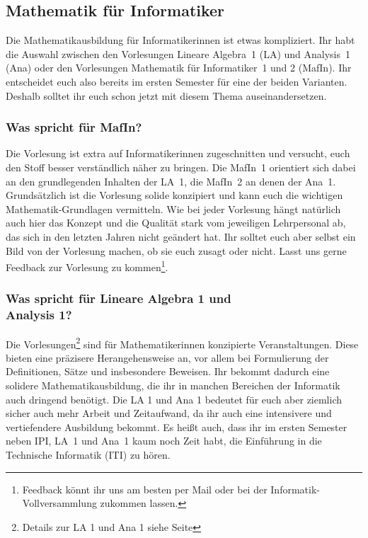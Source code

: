 \subsection{Mathematik für Informatiker}
\label{mafin}
Die Mathematikausbildung für Informatikerinnen ist etwas kompliziert. Ihr habt die Auswahl zwischen den Vorlesungen Lineare Algebra~1 (\gls{LA}) und Analysis~1 (\gls{Ana}) oder den Vorlesungen Mathematik für Informatiker~1 und 2 (\gls{MafIn}). Ihr entscheidet euch also bereits im ersten Semester für eine der beiden Varianten. Deshalb solltet ihr euch schon jetzt mit diesem Thema auseinandersetzen.

\subsubsection{Was spricht für MafIn?}
Die Vorlesung ist extra auf Informatikerinnen zugeschnitten und versucht, euch den Stoff besser verständlich näher zu bringen. Die MafIn~1 orientiert sich dabei an den grundlegenden Inhalten der LA~1, die MafIn~2 an denen der Ana~1. Grundsätzlich ist die Vorlesung solide konzipiert und kann euch die wichtigen Mathematik-Grundlagen vermitteln. Wie bei jeder Vorlesung hängt natürlich auch hier das Konzept und die Qualität stark vom jeweiligen Lehrpersonal ab, das sich in den letzten Jahren nicht geändert hat. Ihr solltet euch aber selbst ein Bild von der Vorlesung machen, ob sie euch zusagt oder nicht. Lasst uns gerne Feedback zur Vorlesung zu kommen\footnote{Feedback könnt ihr uns am besten per Mail oder bei der Informatik-Vollversammlung zukommen lassen.}.

\subsubsection{Was spricht für Lineare Algebra 1 und\\Analysis 1?}
Die Vorlesungen\footnote{Details zur LA 1 und Ana 1 siehe Seite \pageref{la1}} sind für Mathematikerinnen konzipierte Veranstaltungen. Diese bieten eine präzisere Herangehensweise an, vor allem bei Formulierung der Definitionen, Sätze und insbesondere Beweisen. Ihr bekommt dadurch eine solidere Mathematikausbildung, die ihr in manchen Bereichen der Informatik auch dringend benötigt. Die \gls{LA} 1 und \gls{Ana} 1 bedeutet für euch aber ziemlich sicher auch mehr Arbeit und Zeitaufwand, da ihr auch eine intensivere und vertiefendere Ausbildung bekommt. Es heißt auch, dass ihr im ersten Semester neben \gls{IPI}, \gls{LA}~1 und \gls{Ana}~1 kaum noch Zeit habt, die Einführung in die Technische Informatik (\gls{ITI}) zu hören.\\

